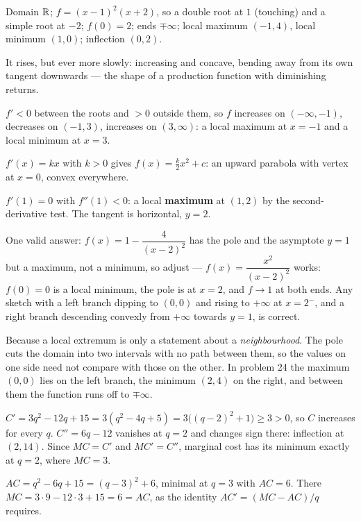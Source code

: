 \begin{solutions}
  \item Domain $\mathbb{R}$; $f=(x-1)^{2}(x+2)$, so a double root at $1$ (touching)
        and a simple root at $-2$; $f(0)=2$; ends $\mp\infty$; local
        maximum $(-1,4)$, local minimum $(1,0)$; inflection $(0,2)$.
  \item It rises, but ever more slowly: increasing and concave, bending
        away from its own tangent downwards --- the shape of a production
        function with diminishing returns.
  \item $f'<0$ between the roots and $>0$ outside them, so $f$ increases on
        $(-\infty,-1)$, decreases on $(-1,3)$, increases on $(3,\infty)$: a
        local maximum at $x=-1$ and a local minimum at $x=3$.
  \item $f'(x)=kx$ with $k>0$ gives $f(x)=\tfrac{k}{2}x^{2}+c$: an upward
        parabola with vertex at $x=0$, convex everywhere.
  \item $f'(1)=0$ with $f''(1)<0$: a local \textbf{maximum} at $(1,2)$ by
        the second-derivative test. The tangent is horizontal, $y=2$.
  \item One valid answer: $f(x)=1-\dfrac{4}{(x-2)^{2}}$ has the pole and the
        asymptote $y=1$ but a maximum, not a minimum, so adjust ---
        $f(x)=\dfrac{x^{2}}{(x-2)^{2}}$ works: $f(0)=0$ is a local minimum,
        the pole is at $x=2$, and $f\to1$ at both ends. Any sketch with a
        left branch dipping to $(0,0)$ and rising to $+\infty$ at $x=2^{-}$,
        and a right branch descending convexly from $+\infty$ towards
        $y=1$, is correct.
  \item Because a local extremum is only a statement about a
        \emph{neighbourhood}. The pole cuts the domain into two intervals
        with no path between them, so the values on one side need not
        compare with those on the other. In problem 24 the maximum $(0,0)$
        lies on the left branch, the minimum $(2,4)$ on the right, and
        between them the function runs off to $\mp\infty$.
  \item $C'=3q^{2}-12q+15=3(q^{2}-4q+5)=3\bigl((q-2)^{2}+1\bigr)\ge3>0$, so
        $C$ increases for every $q$. $C''=6q-12$ vanishes at $q=2$ and
        changes sign there: inflection at $(2,14)$. Since $MC=C'$ and
        $MC'=C''$, marginal cost has its minimum exactly at $q=2$, where
        $MC=3$.
  \item $AC=q^{2}-6q+15=(q-3)^{2}+6$, minimal at $q=3$ with $AC=6$. There
        $MC=3\cdot9-12\cdot3+15=6=AC$, as the identity
        $AC'=(MC-AC)/q$ requires.

\end{solutions}
